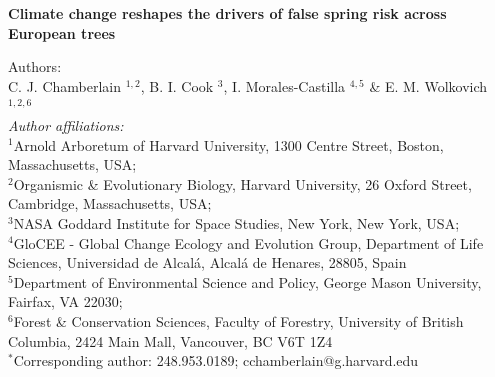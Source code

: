 \documentclass{article}\usepackage[]{graphicx}\usepackage[]{color}
\begin{document}
\noindent 
\textbf{\LARGE{Climate change reshapes the drivers of false spring risk across European trees}} 


\noindent Authors:\\
C. J. Chamberlain $^{1,2}$, B. I. Cook $^{3}$, I. Morales-Castilla $^{4,5}$ \& E. M. Wolkovich $^{1,2,6}$
\vspace{2ex}\\
\emph{Author affiliations:}\\
$^{1}$Arnold Arboretum of Harvard University, 1300 Centre Street, Boston, Massachusetts, USA; \\
$^{2}$Organismic \& Evolutionary Biology, Harvard University, 26 Oxford Street, Cambridge, Massachusetts, USA; \\
$^{3}$NASA Goddard Institute for Space Studies, New York, New York, USA; \\
$^{4}$GloCEE - Global Change Ecology and Evolution Group, Department of Life Sciences, Universidad de Alcal\'{a}, Alcal\'{a} de Henares, 28805, Spain \\
$^{5}$Department of Environmental Science and Policy, George Mason University, Fairfax, VA 22030; \\
$^{6}$Forest \& Conservation Sciences, Faculty of Forestry, University of British Columbia, 2424 Main Mall, Vancouver, BC V6T 1Z4\\
\vspace{2ex}
$^*$Corresponding author: 248.953.0189; cchamberlain@g.harvard.edu\\

\renewcommand{\thetable}{\arabic{table}}
\renewcommand{\thefigure}{\arabic{figure}}
\renewcommand{\labelitemi}{$-$}

\end{document}
